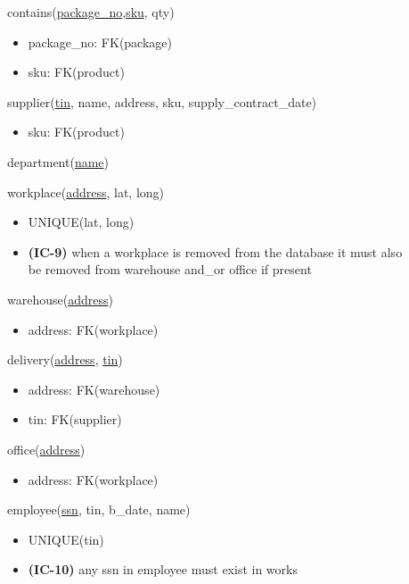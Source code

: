\documentclass[12pt,a4paper]{article}
\begin{document}
\vspace*{10pt}
\noindent
contains(\underline{package\_no},\underline{sku}, qty)
\begin{itemize}[nosep]
    \item package\_no: FK(package)
    \item sku: FK(product)
\end{itemize}

\vspace*{10pt}
\noindent
supplier(\underline{tin}, name, address, sku, supply\_contract\_date)
\begin{itemize}[nosep]
    \item sku: FK(product)
\end{itemize}

\vspace*{10pt}
\noindent
department(\underline{name})

\vspace*{10pt}
\noindent
workplace(\underline{address}, lat, long)
\begin{itemize}[nosep]
    \item UNIQUE(lat, long)
    \item \textsf{\textbf{(IC-9)}} when a workplace \textsf{is removed} from the database it \textsf{must also}\\
          be removed from warehouse \textsf{and\_or} office if present
\end{itemize}

\vspace*{10pt}
\noindent
warehouse(\underline{address})
\begin{itemize}[nosep]
    \item address: FK(workplace)
\end{itemize}

\vspace*{10pt}
\noindent
delivery(\underline{address}, \underline{tin})
\begin{itemize}[nosep]
    \item address: FK(warehouse)
    \item tin: FK(supplier)
\end{itemize}

\vspace*{10pt}
\noindent
office(\underline{address})
\begin{itemize}[nosep]
    \item address: FK(workplace)
\end{itemize}

\vspace*{10pt}
\noindent
employee(\underline{ssn}, tin, b\_date, name)
\begin{itemize}[nosep]
    \item UNIQUE(tin)
    \item \textsf{\textbf{(IC-10)}} any ssn in employee \textsf{must exist} in works
\end{itemize}
\end{document}
